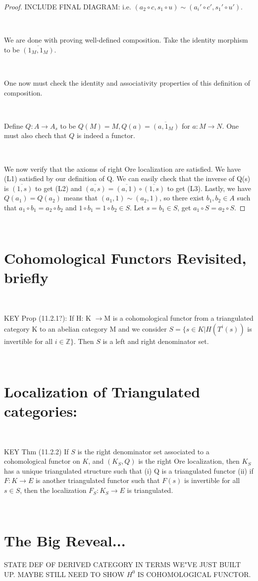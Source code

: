 \documentclass[12pt]{amsart}    %
\theoremstyle{definition}
\begin{document}
\begin{proof}
INCLUDE FINAL DIAGRAM: i.e. $(a_2 \circ c, s_1 \circ u) \sim (a_i' \circ c', s_1' \circ u')$.

\

We are done with proving well-defined composition.  Take the identity morphism to be $\overline{(1_M,1_M)}$.

\

One now must check the identity and associativity properties of this definition of composition.  

\

Define $Q: A \rightarrow A_s$ to be $Q(M) = M, Q(a) = \overline{(a,1_M)}$ for $a: M \rightarrow N$.  One must also chech that $Q$ is indeed a functor.

\

We now verify that the axioms of right Ore localization are satisfied.  We have (L1) satisfied by our definition of Q.  We can easily check that the inverse of Q(s) is $\overline{(1,s)}$ to get (L2) and $\overline{(a,s)} = \overline{(a,1)}\circ \overline{(1,s)}$ to get (L3).  Lastly, we have $Q(a_1)  = Q(a_2)$ means that $(a_1, 1) \sim (a_2, 1)$, so there exist $b_1, b_2 \in A$ such that $a_1 \circ b_1 = a_2 \circ b_2$ and $1 \circ b_1 = 1 \circ b_2 \in S$.  Let $s = b_1 \in S$, get $a_1 \circ S = a_2 \circ S$.


\end{proof}

\

\section{Cohomological Functors Revisited, briefly}


\

KEY Prop (11.2.1?): If H: K $\rightarrow $M is a cohomological functor from a triangulated category K to an abelian category M and we consider $S = \{ s \in K | H(T^i(s)) $ is invertible for all $i \in \mathbb{Z}\}$.  Then $S$ is a left and right denominator set.  

\

\section{Localization of Triangulated categories:}


\

KEY Thm (11.2.2) If $S$ is the right denominator set associated to a cohomological functor on $K$, and $(K_S, Q)$ is the right Ore localization, then $K_S$ has a unique triangulated structure such that (i) Q is a triangulated functor (ii) if $F : K \rightarrow E$ is another triangulated functor such that $F(s)$ is invertible for all $s \in S$, then the localization $F_S: K_S \rightarrow E$ is triangulated.

\

\section{The Big Reveal...}

STATE DEF OF DERIVED CATEGORY IN TERMS WE"VE JUST BUILT UP.  MAYBE STILL NEED TO SHOW $H^0$ IS COHOMOLOGICAL FUNCTOR.
\end{document}
